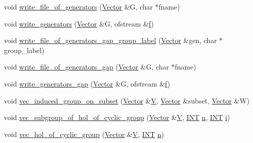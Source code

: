 \begin{DoxyCompactItemize}
\item 
void \mbox{\hyperlink{perm__group__gens_8_c_a54e6e8eb88549e0cfefe641653e84715}{write\+\_\+file\+\_\+of\+\_\+generators}} (\mbox{\hyperlink{class_vector}{Vector}} \&G, char $\ast$fname)
\item 
void \mbox{\hyperlink{perm__group__gens_8_c_ae6b0a48acd164c33e2de0566005a940f}{write\+\_\+generators}} (\mbox{\hyperlink{class_vector}{Vector}} \&G, ofstream \&\mbox{\hyperlink{alphabet2_8_c_a362077c979b0bb65159c603270e40f70}{f}})
\item 
void \mbox{\hyperlink{perm__group__gens_8_c_ae58a2cfa50029df04a015a6c9e529ea9}{write\+\_\+file\+\_\+of\+\_\+generators\+\_\+gap\+\_\+group\+\_\+label}} (\mbox{\hyperlink{class_vector}{Vector}} \&gen, char $\ast$group\+\_\+label)
\item 
void \mbox{\hyperlink{perm__group__gens_8_c_a75e679cabe7c7178aee2378f15d15e34}{write\+\_\+file\+\_\+of\+\_\+generators\+\_\+gap}} (\mbox{\hyperlink{class_vector}{Vector}} \&G, char $\ast$fname)
\item 
void \mbox{\hyperlink{perm__group__gens_8_c_a4514cb772ccb0840095328820d9eaf5d}{write\+\_\+generators\+\_\+gap}} (\mbox{\hyperlink{class_vector}{Vector}} \&G, ofstream \&\mbox{\hyperlink{alphabet2_8_c_a362077c979b0bb65159c603270e40f70}{f}})
\item 
void \mbox{\hyperlink{perm__group__gens_8_c_a18fe71fe1f7f8c7d1cadc3efc1c6d788}{vec\+\_\+induced\+\_\+group\+\_\+on\+\_\+subset}} (\mbox{\hyperlink{class_vector}{Vector}} \&\mbox{\hyperlink{srg_8_c_af40a326b23c68a27cebe60f16634a2cb}{V}}, \mbox{\hyperlink{class_vector}{Vector}} \&subset, \mbox{\hyperlink{class_vector}{Vector}} \&W)
\item 
void \mbox{\hyperlink{perm__group__gens_8_c_abf75fcf99a78bdfb7c0028547f7c0054}{vec\+\_\+subgroup\+\_\+of\+\_\+hol\+\_\+of\+\_\+cyclic\+\_\+group}} (\mbox{\hyperlink{class_vector}{Vector}} \&\mbox{\hyperlink{srg_8_c_af40a326b23c68a27cebe60f16634a2cb}{V}}, \mbox{\hyperlink{galois_8h_a09fddde158a3a20bd2dcadb609de11dc}{I\+NT}} \mbox{\hyperlink{simeon_8_c_a7f2cd26777ce0ff3fdaf8d02aacbddfb}{n}}, \mbox{\hyperlink{galois_8h_a09fddde158a3a20bd2dcadb609de11dc}{I\+NT}} \mbox{\hyperlink{alphabet2_8_c_acb559820d9ca11295b4500f179ef6392}{i}})
\item 
void \mbox{\hyperlink{perm__group__gens_8_c_a9d07604f4a1c321585752cabfc94955b}{vec\+\_\+hol\+\_\+of\+\_\+cyclic\+\_\+group}} (\mbox{\hyperlink{class_vector}{Vector}} \&\mbox{\hyperlink{srg_8_c_af40a326b23c68a27cebe60f16634a2cb}{V}}, \mbox{\hyperlink{galois_8h_a09fddde158a3a20bd2dcadb609de11dc}{I\+NT}} \mbox{\hyperlink{simeon_8_c_a7f2cd26777ce0ff3fdaf8d02aacbddfb}{n}})

\end{DoxyCompactItemize}
